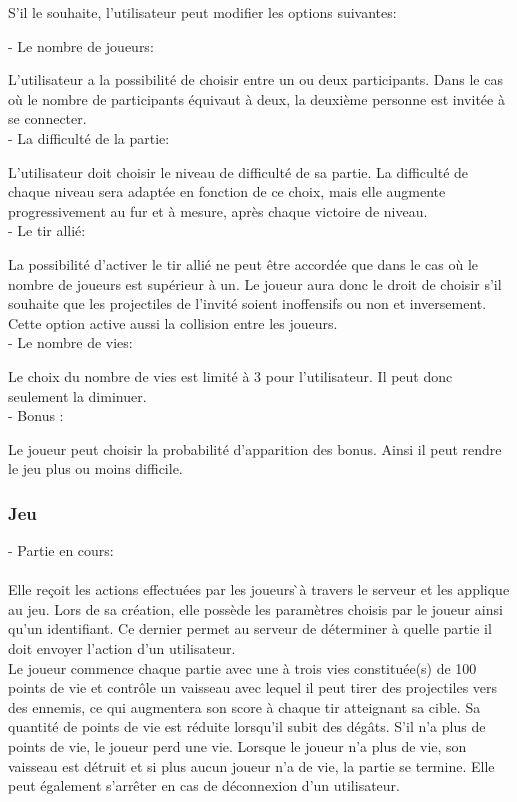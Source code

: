\documentclass[a4paper,12pt]{article}
\begin{document}
S'il le souhaite, l'utilisateur peut modifier les options suivantes:

- Le nombre de joueurs: 

L'utilisateur a la possibilité de choisir entre un ou deux participants. Dans le cas où le nombre de participants équivaut à deux, la deuxième personne est invitée à se connecter.\\

- La difficulté de la partie:

 L'utilisateur doit choisir le niveau de difficulté  de sa partie. La difficulté de chaque niveau sera adaptée en fonction de ce choix, mais elle augmente progressivement au fur et à mesure, après chaque victoire de niveau. \\

- Le tir allié: 

La possibilité d'activer le tir allié ne peut être accordée que dans le cas où le nombre de joueurs est supérieur à un.
Le joueur aura donc le droit de choisir s'il souhaite que les projectiles de l'invité soient inoffensifs ou non et inversement. Cette option active aussi la collision entre les joueurs. \\

- Le nombre de vies: 

Le choix du nombre de vies est limité à 3 pour l'utilisateur.  Il peut donc seulement la diminuer.\\

- Bonus :

Le joueur peut choisir la probabilité d'apparition des bonus. Ainsi il peut rendre le jeu plus ou moins difficile. 

\subsubsection{Jeu}

- Partie en cours:\\ \\
Elle reçoit les actions effectuées par les joueurs ̀à travers le serveur et les applique au jeu. 
Lors de sa création, elle possède les paramètres choisis par le joueur ainsi qu’un identifiant. 
Ce dernier permet au serveur de déterminer à quelle partie il doit envoyer l’action d’un 
utilisateur.\\

Le joueur commence chaque partie avec une à trois vies constituée(s) de 100 points de vie et
contrôle un vaisseau avec lequel il peut tirer des projectiles vers des ennemis, ce qui 
augmentera son score à chaque tir atteignant sa cible. Sa quantité de points de vie est réduite
lorsqu’il subit des dégâts. S’il n’a plus de points de vie, le joueur perd une vie. Lorsque le 
joueur n’a plus de vie, son vaisseau est détruit et si plus aucun joueur n’a de vie, la partie se 
termine. Elle peut également s’arrêter en cas de déconnexion d’un utilisateur.\\
\end{document}
